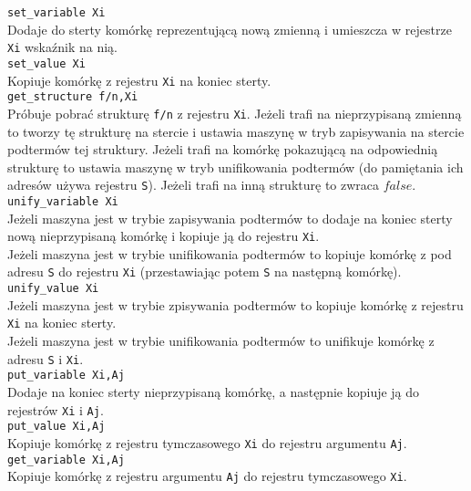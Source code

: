 \texttt{set\_variable Xi}\\
Dodaje do sterty komórkę reprezentującą nową zmienną i umieszcza w rejestrze \texttt{Xi} wskaźnik na nią.\\

\texttt{set\_value Xi}\\
Kopiuje komórkę z rejestru \texttt{Xi} na koniec sterty.\\

\texttt{get\_structure f/n,Xi}\\
Próbuje pobrać strukturę \texttt{f/n} z rejestru \texttt{Xi}. Jeżeli trafi na nieprzypisaną zmienną to tworzy tę strukturę na stercie i ustawia maszynę w tryb zapisywania na stercie podtermów tej struktury. Jeżeli trafi na komórkę pokazującą na odpowiednią strukturę to ustawia maszynę w tryb unifikowania podtermów (do pamiętania ich adresów używa rejestru \texttt{S}). Jeżeli trafi na inną strukturę to zwraca $false$.\\

\texttt{unify\_variable Xi}\\
Jeżeli maszyna jest w trybie zapisywania podtermów to dodaje na koniec sterty nową nieprzypisaną komórkę i kopiuje ją do rejestru \texttt{Xi}.\\
Jeżeli maszyna jest w trybie unifikowania podtermów to kopiuje komórkę z pod adresu \texttt{S} do rejestru \texttt{Xi} (przestawiając potem \texttt{S} na następną komórkę).\\

\texttt{unify\_value Xi}\\
Jeżeli maszyna jest w trybie zpisywania podtermów to kopiuje komórkę z rejestru \texttt{Xi} na koniec sterty.\\
Jeżeli maszyna jest w trybie unifikowania podtermów to unifikuje komórkę z adresu \texttt{S} i \texttt{Xi}.\\

\texttt{put\_variable Xi,Aj}\\
Dodaje na koniec sterty nieprzypisaną komórkę, a następnie kopiuje ją do rejestrów \texttt{Xi} i \texttt{Aj}.\\

\texttt{put\_value Xi,Aj}\\
Kopiuje komórkę z rejestru tymczasowego \texttt{Xi} do rejestru argumentu \texttt{Aj}.\\

\texttt{get\_variable Xi,Aj}\\
Kopiuje komórkę z rejestru argumentu \texttt{Aj} do rejestru tymczasowego \texttt{Xi}.\\

